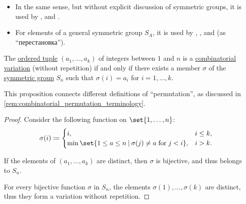 \begin{remark}
\begin{itemize}
    \item In the same sense, but without explicit discussion of symmetric groups, it is used by
    ,
     and
    .

    \item For elements of a general symmetric group \( S_A \), it is used by
    ,
    ,
     and
     (as \enquote{перестановка}).
  \end{itemize}
\end{remark}

\begin{proposition}\label{thm:combinatorial_and_algebraic_permutation}
  The \hyperref[def:ordered_tuple]{ordered tuple} \( (a_1, \ldots, a_k) \) of integers between \( 1 \) and \( n \) is a \hyperref[def:combinatorial_variation]{combinatorial variation} (without repetition) if and only if there exists a member \( \sigma \) of the \hyperref[def:symmetric_group]{symmetric group} \( S_n \) such that \( \sigma(i) = a_i \) for \( i = 1, \ldots, k \).
\end{proposition}
\begin{comments}
  \item This proposition connects different definitions of \enquote{permutation}, as discussed in \cref{rem:combinatorial_permutation_terminology}.
\end{comments}
\begin{proof}
  \SufficiencySubProof Consider the following function on \( \set{ 1, \ldots, n } \):
  \begin{equation*}
    \sigma(i) \coloneqq \begin{cases}
      i,                                                                  &i \leq k, \\
      \min\set{ 1 \leq a \leq n \given \sigma(j) \neq a \T{for} j < i }, &i > k.
    \end{cases}
  \end{equation*}

  If the elements of \( (a_1, \ldots, a_k) \) are distinct, then \( \sigma \) is bijective, and thus belongs to \( S_n \).

  \NecessitySubProof For every bijective function \( \sigma \) in \( S_n \), the elements \( \sigma(1), \ldots, \sigma(k) \) are distinct, thus they form a variation without repetition.
\end{proof}

